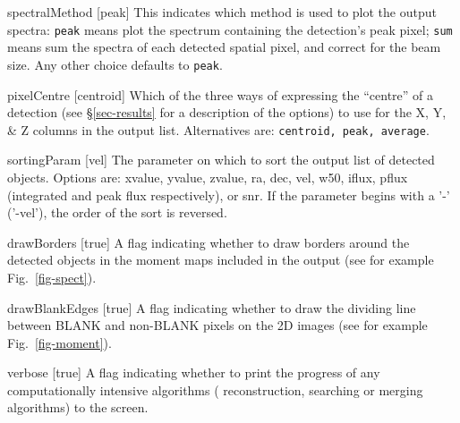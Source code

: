 \begin{Lentry}
\item[{spectralMethod [peak]}] This indicates which method is used
  to plot the output spectra: \texttt{peak} means plot the spectrum
  containing the detection's peak pixel; \texttt{sum} means sum the
  spectra of each detected spatial pixel, and correct for the beam
  size. Any other choice defaults to \texttt{peak}.
\item[{pixelCentre [centroid]}] Which of the three ways of
  expressing the ``centre'' of a detection (see \S\ref{sec-results}
  for a description of the options) to use for the X, Y, \& Z
  columns in the output list. Alternatives are: \texttt{centroid, peak,
  average}.
\item[{sortingParam [vel]}] The parameter on which to sort the output
  list of detected objects. Options are: xvalue, yvalue, zvalue, ra,
  dec, vel, w50, iflux, pflux (integrated and peak flux respectively),
  or snr. If the parameter begins with a '-' (\eg '-vel'), the order
  of the sort is reversed.
\item[{drawBorders [true]}] A flag indicating whether to draw
  borders around the detected objects in the moment maps included in
  the output (see for example Fig.~\ref{fig-spect}).
\item[{drawBlankEdges [true]}] A flag indicating whether to
  draw the dividing line between BLANK and non-BLANK pixels on the
  2D images (see for example Fig.~\ref{fig-moment}).
\item[{verbose [true]}] A flag indicating whether to print the
  progress of any computationally intensive algorithms (\eg
  reconstruction, searching or merging algorithms) to the screen.
\end{Lentry}


